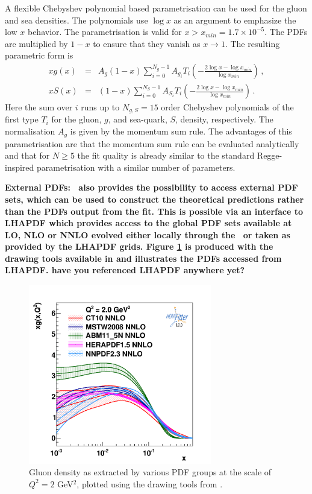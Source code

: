 \begin{description}
A flexible Chebyshev polynomial based parametrisation can be used for the gluon and sea densities. The polynomials
use $\log x$ as an argument to emphasize the low $x$ behavior. 
The parametrisation is valid for $x>x_{min} = 1.7\times 10^{-5}$. The PDFs are multiplied
by $1-x$ to ensure that they vanish as $x\to 1$. The resulting parametric form is 
\begin{eqnarray}
x g(x) &=& A_g \left(1-x\right) \sum_{i=0}^{N_g-1} A_{g_i} T_i \left(-\frac{\textstyle 2\log x - \log x_{min} } {\textstyle \log x_{min} } \right)\,, \label{eq:glu} \\
x S(x) &=& \left(1-x\right) \sum_{i=0}^{N_S-1} A_{S_i} T_i \left(-\frac{\textstyle 2\log x - \log x_{min} } {\textstyle \log x_{min} } \right)\,. \label{eq:sea} 
\end{eqnarray}
Here the sum over $i$ runs up to $N_{g,S}=15$ order Chebyshev polynomials of the first type $T_i$ for
the gluon, $g$, and sea-quark, $S$, density, respectively. 
The normalisation $A_g$ is given by the momentum sum rule.
%
The advantages of this parametrisation are that the momentum sum rule can be evaluated analytically 
and that for $N \ge 5$ the fit quality is already similar
to the standard Regge-inspired parametrisation with a similar number of parameters.
%
\item \bf{External PDFs:} \rm 
\fitter\ also provides the possibility to access external PDF sets, which can be used to construct the theoretical predictions rather than the PDFs output from the fit. This is possible via an interface to LHAPDF which provides access to the global PDF sets available at LO, NLO or NNLO evolved either locally through the \fitter\ or taken as provided by the LHAPDF grids. Figure \ref{fig:pdfs} is produced with the drawing tools available in \fitter and illustrates the PDFs accessed from LHAPDF. {\bf have you referenced LHAPDF anywhere yet?}
\end{description}
%
\begin{figure}[!ht]
   \centering
   \includegraphics[width=8cm]{pdfs.pdf}
   \caption{Gluon density as extracted by various PDF groups at the scale of $Q^2=2$ GeV$^2$, plotted using the drawing tools from \fitter.} 
 \label{fig:pdfs}
\end{figure}
%

